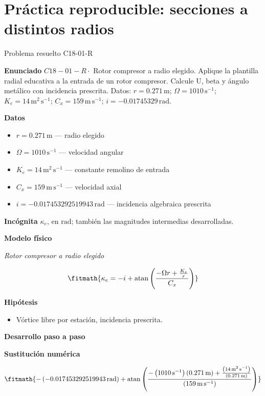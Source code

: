 \documentclass[10pt,openany]{book}
\begin{document}
\chapter{Práctica reproducible: secciones a distintos radios}
\begin{studiumworked}{Problema resuelto C18-01-R}


\noindent\textbf{Enunciado}
\(C18-01-R \cdot\) Rotor compresor a radio elegido. Aplique la plantilla radial educativa a la entrada de un rotor compresor. Calcule U, beta y ángulo metálico con incidencia prescrita. Datos: \(r=0.271\, \mathrm{m}\); \(\Omega=1010\, \mathrm{s}^{-1}\); \(K_e=14\, \mathrm{m}^{2}\,\mathrm{s}^{-1}\); \(C_x=159\, \mathrm{m}\,\mathrm{s}^{-1}\); \(i=-0.01745329\, \mathrm{rad}\).

\noindent\textbf{Datos}
\begin{itemize}
\item $r = 0.271\,\mathrm{m}$ — radio elegido
\item $\Omega = 1010\,\mathrm{s}^{-1}$ — velocidad angular
\item $K_e = 14\,\mathrm{m}^{2}\,\mathrm{s}^{-1}$ — constante remolino de entrada
\item $C_x = 159\,\mathrm{m}\,\mathrm{s}^{-1}$ — velocidad axial
\item $i = -0.017453292519943\,\mathrm{rad}$ — incidencia algebraica prescrita
\end{itemize}

\noindent\textbf{Incógnita}
$\kappa_e$, en $\mathrm{rad}$; también las magnitudes intermedias desarrolladas.

\noindent\textbf{Modelo físico}

\noindent\textit{Rotor compresor a radio elegido}

\[
\fitmath{\kappa_e=- i + \operatorname{atan}{\left(\frac{- \Omega r + \frac{K_e}{r}}{C_x} \right)}}
\]

\noindent\textbf{Hipótesis}
\begin{itemize}
\item Vórtice libre por estación, incidencia prescrita.
\end{itemize}

\noindent\textbf{Desarrollo paso a paso}



\noindent\textbf{Sustitución numérica}

\[
\fitmath{- \left(-0.017453292519943\,\mathrm{rad}\right) + \operatorname{atan}{\left(\frac{- \left(1010\,\mathrm{s}^{-1}\right) \left(0.271\,\mathrm{m}\right) + \frac{\left(14\,\mathrm{m}^{2}\,\mathrm{s}^{-1}\right)}{\left(0.271\,\mathrm{m}\right)}}{\left(159\,\mathrm{m}\,\mathrm{s}^{-1}\right)} \right)}}
\]


\end{studiumworked}
\end{document}
